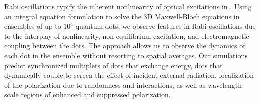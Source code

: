 Rabi oscillations typify the inherent nonlinearity of optical excitations in \qds{}. %
Using an integral equation formulation to solve  the 3D Maxwell-Bloch equations in ensembles of up to $10^4$ quantum dots, we observe features in Rabi oscillations due to the interplay of nonlinearity, non-equilibrium excitation, and electromagnetic coupling between the dots.
The approach allows us to observe the dynamics of each dot in the ensemble without resorting to spatial averages.
Our simulations predict synchronized multiplets of dots that exchange energy, dots that dynamically couple to screen the effect of incident external radiation, localization of the polarization due to randomness and interactions, as well as wavelength-scale regions of enhanced and suppressed polarization.
